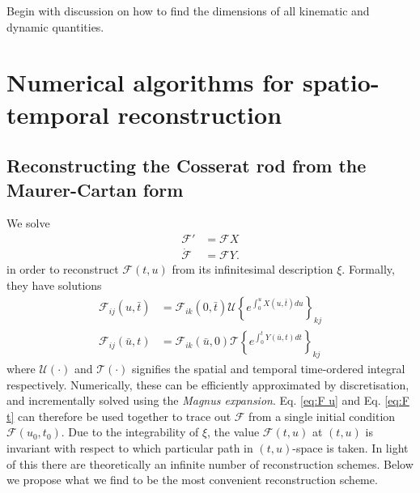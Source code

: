 \documentclass[withindex,glossary,techreport]{cam-thesis}
\begin{document}
Begin with discussion on how to find the dimensions of all kinematic and dynamic quantities.

\chapter{Numerical algorithms for spatio-temporal reconstruction} 

\section{Reconstructing the Cosserat rod from the Maurer-Cartan form} \label{app:Reconstructing the Cosserat rod from xi}

We solve
\begin{subequations} 
\begin{align}
\mathcal{F}' & =  \mathcal{F}X \label{eq:F u} \\
\dot{\mathcal{F}} & = \mathcal{F} \label{eq:F t} Y.
\end{align}
\end{subequations}
in order to reconstruct $\mathcal{F}(t,u)$ from its infinitesimal description $\xi$. Formally, they have solutions
\begin{subequations} 
\begin{align}
\mathcal{F}_{ij}(u, \bar{t}) & = \mathcal{F}_{ik}(0, \bar{t}) \mathscr{U} \left\{ e^{ \int_0^u X(u, \bar{t}) du } \right\}_{kj} \\
\mathcal{F}_{ij}(\bar{u}, t) & = \mathcal{F}_{ik}(\bar{u}, 0) \mathscr{T} \left\{ e^{ \int_0^t Y(\bar{u}, t) dt } \right\}_{kj}
\end{align}
\end{subequations}
where $\mathscr{U}(\cdot)$ and $\mathscr{T}(\cdot)$ signifies the spatial and temporal time-ordered integral respectively. Numerically, these can be efficiently approximated by discretisation, and incrementally solved using the \textit{Magnus expansion}. Eq. \ref{eq:F u} and Eq. \ref{eq:F t}
can therefore be used together to trace out $\mathcal{F}$
from a single initial condition $\mathcal{F}(u_{0}, t_{0})$. Due to
the integrability of $\xi$, the value $\mathcal{F}(t, u)$ at $(t, u)$ is invariant with respect to which particular path
in $(t, u)$-space is taken. In light of this there are theoretically
an infinite number of reconstruction schemes. Below we propose what
we find to be the most convenient reconstruction scheme.
\end{document}
